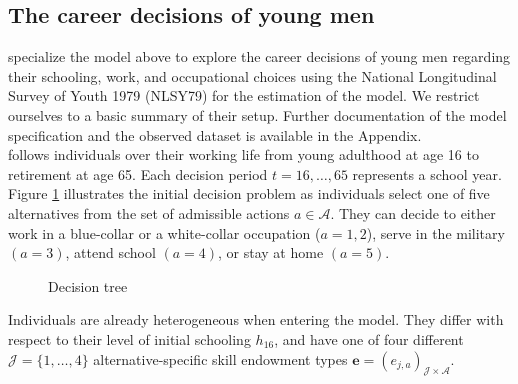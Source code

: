 \subsection{The career decisions of young men}
\citet{Keane.1997} specialize the model above to explore the career decisions of young men regarding their schooling, work, and occupational choices using the National Longitudinal Survey of Youth 1979 (NLSY79) \citep{NLSY.2019} for the estimation of the model. We restrict ourselves to a basic summary of their setup. Further documentation of the model specification and the observed dataset is available in the Appendix.\\

\noindent \citet{Keane.1997} follows individuals over their working life from young adulthood at age 16 to retirement at age 65. Each decision period $t = 16, \dots, 65$ represents a school year. Figure \ref{Decision tree} illustrates the initial decision problem as individuals select one of five alternatives from the set of admissible actions $a\in\mathcal{A}$. They can  decide to either work in a blue-collar or a white-collar occupation ($a = 1, 2$), serve in the military $(a = 3)$, attend school $(a = 4)$, or stay at home $(a = 5)$.\\


\begin{figure}[t!]\centering
	\scalebox{0.75}{}
	\caption{Decision tree}\label{Decision tree}
\end{figure}\FloatBarrier

\noindent Individuals are already heterogeneous when entering the model. They differ with respect to their level of initial schooling $h_{16}$, and have one of four different $\mathcal{J} = \{1, \hdots, 4\}$ alternative-specific skill endowment types $\bm{e} = \left(e_{j,a}\right)_{\mathcal{J} \times \mathcal{A}}$.\\

